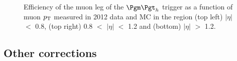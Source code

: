 \begin{figure}[htb]

\begin{center}
\end{center}
\caption[Efficiency of the muon leg of the $\mutau$ trigger as a function of muon $\pt$ measured in
2012 data and MC.]{Efficiency of the muon leg of the $\mutau$ trigger as a function of muon $\pt$ measured in
2012 data and \ac{MC} in the region (top left) $|\eta|$ $<$ 0.8, (top right) 0.8
$<$ $|\eta|$ $<$ 1.2 and (bottom) $|\eta|$ $>$ 1.2.}
\label{fig:muontrg}
\end{figure}

\subsection{Other corrections}
\label{sec:othercorrections}

